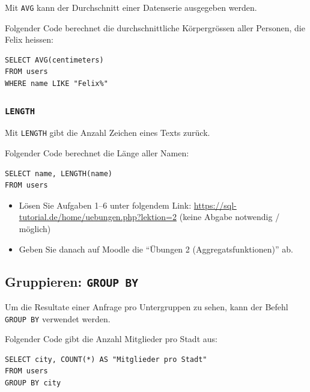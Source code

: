 Mit \lstinline|AVG| kann der Durchschnitt einer Datenserie ausgegeben werden.

\begin{myexample}
Folgender Code berechnet die durchschnittliche Körpergrössen aller Personen, die Felix heissen:

\begin{lstlisting}
SELECT AVG(centimeters) 
FROM users 
WHERE name LIKE "Felix%"
\end{lstlisting}
\end{myexample}

\subsubsection{\texorpdfstring{\lstinline|LENGTH|}{LENGTH}}

Mit \lstinline|LENGTH| gibt die Anzahl Zeichen eines Texts zurück.

\begin{myexample}
Folgender Code berechnet die Länge aller Namen:

\begin{lstlisting}
SELECT name, LENGTH(name) 
FROM users
\end{lstlisting}
\end{myexample}

\begin{mysubmission}
  \begin{itemize}
    \item Lösen Sie Aufgaben 1--6 unter folgendem Link: \url{https://sql-tutorial.de/home/uebungen.php?lektion=2} (keine Abgabe notwendig / möglich)
    \item Geben Sie danach auf Moodle die ``Übungen 2 (Aggregatsfunktionen)'' ab.
  \end{itemize}
\end{mysubmission}

\subsection{Gruppieren: \texorpdfstring{\lstinline|GROUP BY|}{GROUP BY}}
Um die Resultate einer Anfrage pro Untergruppen zu sehen, kann der Befehl \lstinline|GROUP BY| verwendet werden.

\begin{myexample}
Folgender Code gibt die Anzahl Mitglieder pro Stadt aus:
\begin{lstlisting}
SELECT city, COUNT(*) AS "Mitglieder pro Stadt" 
FROM users 
GROUP BY city
\end{lstlisting}
\end{myexample}

